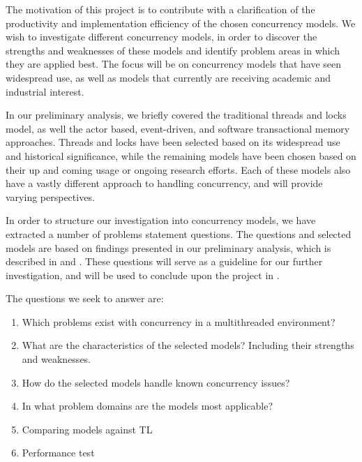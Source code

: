 \makeatletter {}\makeatother
{}
The motivation of this project is to contribute with a clarification of the productivity and implementation efficiency of the chosen concurrency models. We wish to investigate different concurrency models, in order to discover the strengths and weaknesses of these models and identify problem areas in which they are applied best. The focus will be on concurrency models that have seen widespread use, as well as models that currently are receiving academic and industrial interest.

In our preliminary analysis, we briefly covered the traditional threads and locks model, as well the actor based, event-driven, and software transactional memory approaches. Threads and locks have been selected based on its widespread use and historical significance, while the remaining models have been chosen based on their up and coming usage or ongoing research efforts. Each of these models also have a vastly different approach to handling concurrency, and will provide varying perspectives.

In order to structure our investigation into concurrency models, we have extracted a number of problems statement questions. The questions and selected models are based on findings presented in our preliminary analysis, which is described in  and . These questions will serve as a guideline for our further investigation, and will be used to conclude upon the project in .

The questions we seek to answer are:
\begin{enumerate}
\item Which problems exist with concurrency in a multithreaded environment? 
\item What are the characteristics of the selected models? Including their strengths and weaknesses.
\item How do the selected models handle known concurrency issues?
\item In what problem domains are the models most applicable?
\item Comparing models against \ac{TL}
\item Performance test
\end{enumerate}


